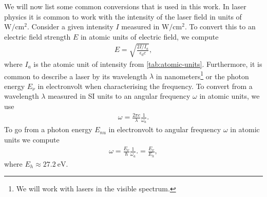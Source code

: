         We will now list some common conversions that is used in this work.
        In laser physics it is common to work with the intensity of the laser
        field in units of $\si{\watt/\cm^2}$.
        Consider a given intensity $I$ measured in $\si{\watt/\cm^2}$.
        To convert this to an electric field strength $E$ in atomic units of
        electric field, we compute
        \begin{align}
            E = \sqrt{\frac{2 I / I_a}{\epsilon_0 c}},
            \label{eq:intnsity-to-au-electric-field}
        \end{align}
        where $I_a$ is the atomic unit of intensity from
        \autoref{tab:atomic-units}.
        Furthermore, it is common to describe a laser by its wavelength
        $\lambda$ in nanometers\footnote{%
            We will work with lasers in the visible spectrum.
        } or the photon energy $E_{\nu}$ in electronvolt when characterising the
        frequency.
        To convert from a wavelength $\lambda$ measured in SI units to an
        angular frequency $\omega$ in atomic units, we use
        \begin{align}
            \omega = \frac{2\pi c}{\lambda}\frac{1}{\omega_a}.
        \end{align}
        To go from a photon energy $E_{nu}$ in electronvolt to angular frequency
        $\omega$ in atomic units we compute
        \begin{align}
            \omega = \frac{E_{\nu}}{\hslash}\frac{1}{\omega_a}.
            = \frac{E_{\nu}}{E_h},
        \end{align}
        where $E_h \approx \SI{27.2}{\electronvolt}$.

\clearpage
